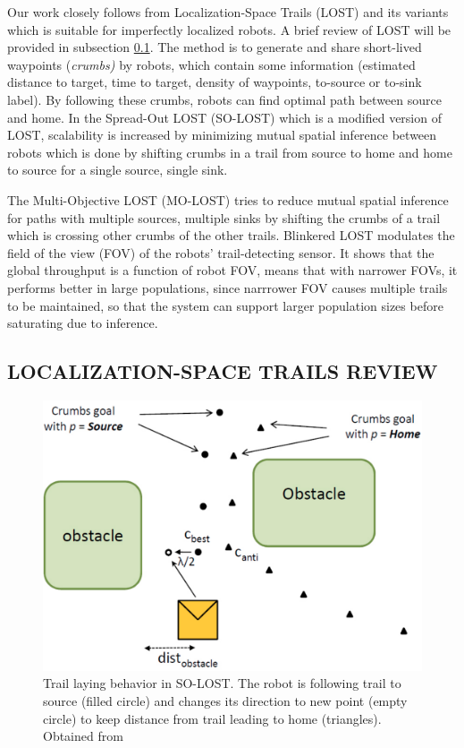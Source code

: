 \documentclass[letterpaper, 10 pt, conference]{ieeeconf}  %
\begin{document}
Our work closely follows from Localization-Space Trails (LOST) \cite{LOST} and its variants which is suitable for imperfectly localized robots. A brief review of LOST will be provided in subsection \ref{ssection:LOST_review}. The method is to generate and share short-lived waypoints (\emph{crumbs)} by robots, which contain some information (estimated distance to target, time to target, density of waypoints, to-source or to-sink label). By following these crumbs, robots can find optimal path between source and home. In the Spread-Out LOST (SO-LOST) \cite{SO_LOST} which is a modified version of LOST, scalability is increased by minimizing mutual spatial inference between robots which is done by shifting crumbs in a trail from source to home and home to source for a single source, single sink. 

The Multi-Objective LOST (MO-LOST) \cite{MO_LOST} tries to reduce mutual spatial inference for paths with multiple sources, multiple sinks by shifting the crumbs of a trail which is crossing other crumbs of the other trails. Blinkered LOST \cite{BLINKERED_LOST} modulates the field of the view (FOV) of the robots' trail-detecting sensor. It shows that the global throughput is a function of robot FOV, means that with narrower FOVs, it performs better in large populations, since narrrower FOV causes multiple trails to be maintained, so that the system can support larger population sizes before saturating due to inference.

\subsection{LOCALIZATION-SPACE TRAILS REVIEW} \label{ssection:LOST_review}

\begin{figure}
   \includegraphics[width=0.9\linewidth]{SO_LOST_crumb_laying.png}
   \centering
   \caption{Trail laying behavior in SO-LOST. The robot is following trail to source (filled circle) and changes its direction to new point (empty circle) to keep distance from trail leading to home (triangles). Obtained from \cite{SO_LOST}}
   \label{fig:SO_LOST_crumb_laying}
\end{figure}
\end{document}
